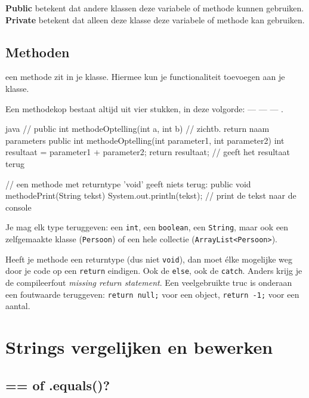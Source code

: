 \documentclass[a4paper,11pt]{article}
\begin{document}
\textbf{Public} betekent dat andere klassen deze variabele of methode
kunnen gebruiken.
\textbf{Private} betekent dat alleen deze klasse deze variabele of methode
kan gebruiken.

\subsection{Methoden}

een methode zit in je klasse. Hiermee
kun je functionaliteit toevoegen aan je klasse.

Een methodekop bestaat altijd uit vier stukken, in deze volgorde:
 ---  ---  ---
.

\begin{codeblock}{java}
    // public   int      methodeOptelling(int a, int b)
    // zichtb.  return   naam            parameters
    public int methodeOptelling(int parameter1, int parameter2)
    {
            int resultaat = parameter1 + parameter2;
            return resultaat; // geeft het resultaat terug
        }

    // een methode met returntype 'void' geeft niets terug:
    public void methodePrint(String tekst)
    {
            System.out.println(tekst); // print de tekst naar de console
        }
\end{codeblock}

Je mag elk type teruggeven: een \texttt{int}, een \texttt{boolean}, een
\texttt{String}, maar ook een zelfgemaakte klasse (\texttt{Persoon}) of een hele
collectie (\texttt{ArrayList<Persoon>}).

\begin{warningbox}
    Heeft je methode een returntype (dus niet \texttt{void}), dan moet \'elke
    mogelijke weg door je code op een \texttt{return} eindigen. Ook de \texttt{else},
    ook de \texttt{catch}. Anders krijg je de compileerfout
    \textit{missing return statement}. Een veelgebruikte truc is onderaan een
    foutwaarde teruggeven: \texttt{return null;} voor een object,
    \texttt{return -1;} voor een aantal.
\end{warningbox}

\section{Strings vergelijken en bewerken}
\label{sec:strings}

\subsection{== of .equals()?}
\end{document}
